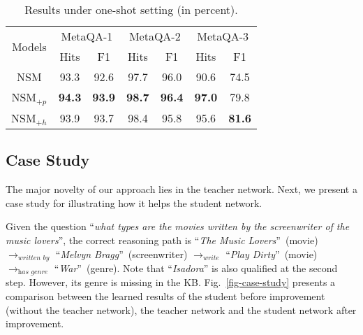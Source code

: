 
\begin{table}[htbp]
	\centering
	\caption{Results under one-shot setting (in percent).}
	\label{tab:res-1shot}\begin{tabular}{c c c |c c |c c }
\hline
			\multirow{2}{*}{Models}&\multicolumn{2}{c}{MetaQA-1}&\multicolumn{2}{c}{MetaQA-2}&\multicolumn{2}{c}{MetaQA-3}\\
			\cline{2-7}
			&Hits&F1&Hits&F1&Hits&F1\\
			\hline
			NSM	&	 93.3& 92.6 &  97.7& 96.0& 90.6& 74.5\\
			\hline
			NSM$_{+p}$&	 \textbf{94.3}&  \textbf{93.9}&  \textbf{98.7}& \textbf{96.4}& \textbf{97.0}& 79.8\\
NSM$_{+h}$&	 93.9&  93.7&  98.4& 95.8& 95.6& \textbf{81.6}\\
			\hline
		\end{tabular}\end{table}

\subsection{Case Study}




The major novelty of our approach lies in the teacher network.   Next, we present a case study for illustrating how it helps the student network.

Given the question ``\emph{what types are the movies written by the screenwriter of the music lovers}'', the correct reasoning path is 
 ``\emph{The Music Lovers}''~(movie) $\rightarrow_{\textit{written by}}$  ``\emph{Melvyn Bragg}''~(screenwriter) $\rightarrow_{\textit{write}}$ ``\emph{Play Dirty}''~(movie) $\rightarrow_{\textit{has genre}}$ ``\emph{War}''~(genre). Note that ``\emph{Isadora}'' is also qualified at the second step.
However, its genre is missing in the KB.
Fig.~\ref{fig-case-study} presents a comparison between the learned results of the student before improvement (\ie without the teacher network), the teacher network and the student network after improvement. 





